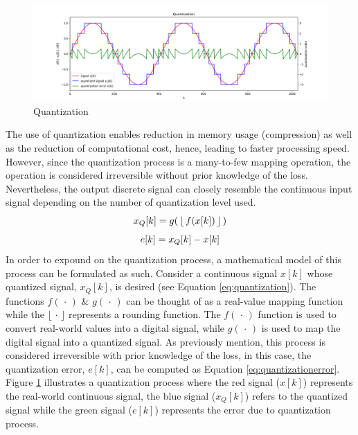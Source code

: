 \begin{figure}[hbt!]\centering
\includegraphics[width=\textwidth]{image/general/quantization.png}
\caption{Quantization}
\label{fig:quantize}
\end{figure}


The use of quantization enables reduction in memory usage (compression) as well as the reduction of computational cost, hence, leading to faster processing speed. However, since the quantization process is a many-to-few mapping operation, the operation is considered irreversible without prior knowledge of the loss. Nevertheless, the output discrete signal can closely resemble the continuous input signal depending on the number of quantization level used.
\begin{equation}\centering
\label{eq:quantization}
x_Q[k] = g( \mspace{3mu}\lfloor \mspace{3mu}f(x[k]) \mspace{3mu}\rfloor\mspace{3mu})
\end{equation} 
\vspace{-3em}
\begin{equation}\centering
\label{eq:quantizationerror}
e[k] = x_Q[k] - x[k]
\end{equation}
In order to expound on the quantization process, a mathematical model of this process can be formulated as such. Consider a continuous signal $x[k]$ whose quantized signal, $x_Q[k]$, is desired (see Equation \ref{eq:quantization}). The functions $f (\mspace{3mu} \cdot  \mspace{3mu})$ \& $g (\mspace{3mu} \cdot  \mspace{3mu})$ can be thought of as a real-value mapping function while the $\lfloor \mspace{3mu} \cdot  \mspace{3mu} \rfloor$ represents a rounding function. The $f (\mspace{3mu} \cdot  \mspace{3mu})$ function is used to convert real-world values into a digital signal, while $g (\mspace{3mu} \cdot  \mspace{3mu})$ is used to map the digital signal into a quantized signal. As previously mention, this process is considered irreversible with prior knowledge of the loss, in this case, the quantization error, $e[k]$, can be computed as Equation \ref{eq:quantizationerror}. Figure \ref{fig:quantize} illustrates a quantization process where the red signal ($x[k]$) represents the real-world continuous signal, the blue signal ($x_Q[k]$) refers to the quantized signal while the green signal ($e[k]$) represents the error due to quantization process.

